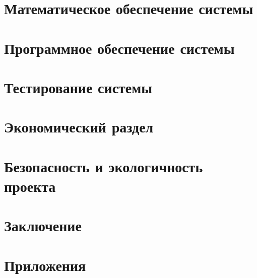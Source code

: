 \documentclass[a4paper,utf8,pointsection,nocolumnvii,nocolumnviii,nocolumnsxix,pointsubsection]{eskdtext}
\begin{document}
\section{Математическое обеспечение системы} \label{sec:mathematical-supply}


\newpage
{}
\section{Программное обеспечение системы} \label{sec:software}


\newpage
{}
\section{Тестирование системы} \label{sec:testing}


\newpage
{}
\section{Экономический раздел} \label{sec:economics}


\newpage
{}
\section{Безопасность и экологичность проекта} \label{sec:safety}


\newpage
{}
\section*{Заключение}


\newpage
{}
\renewcommand\refname{Список использованных источников}


\newpage
{}
\section*{Приложения}
\setcounter{appendix}{0}


\newpage
{}


\newpage
{}

\end{document}
